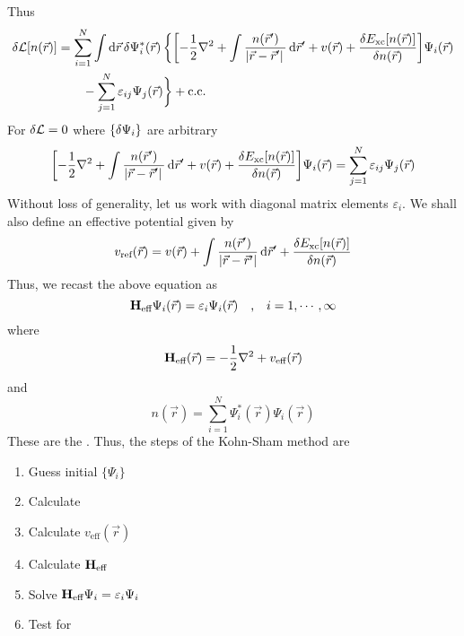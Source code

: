 \documentclass[12pt,a4paper,titlepage]{article}
\newcommand{\trm}[1]{\textrm{#1}} %
\newcommand{\ul}[1]{\underline{\smash{#1}}} %
\begin{document}
Thus
\begin{equation}
\begin{aligned}
\var{\mathcal{L}[n(\vec{r})]}&=\sum_{i=1}^{N}\int\dd{\vec{r}}\var{\Psi_{i}^{*}(\vec{r})}\bigg\{\qty[-\frac{1}{2}\nabla^{2}+\int\frac{n(\vec{r}^{\prime})}{\abs*{\vec{r}-\vec{r}^{\prime}}}\dd{\vec{r}^{\prime}}+v(\vec{r})+\fdv{E_{\trm{xc}}[n(\vec{r})]}{n(\vec{r})}]\Psi_{i}(\vec{r})\\
&\quad\quad-\sum_{j=1}^{N}\varepsilon_{ij}\Psi_{j}(\vec{r})\bigg\}+\qcc*
\end{aligned}	
\end{equation}
For $\var{\mathcal{L}}=0$ where $\{\var{\Psi_{i}}\}$ are arbitrary
\begin{equation}
\qty[-\frac{1}{2}\nabla^{2}+\int\frac{n(\vec{r}^{\prime})}{\abs*{\vec{r}-\vec{r}^{\prime}}}\dd{\vec{r}^{\prime}}+v(\vec{r})+\fdv{E_{\trm{xc}}[n(\vec{r})]}{n(\vec{r})}]\Psi_{i}(\vec{r})=\sum_{j=1}^{N}\varepsilon_{ij}\Psi_{j}(\vec{r})
\end{equation}
Without loss of generality, let us work with diagonal matrix elements $\varepsilon_{i}$. We shall also define an effective potential given by
\begin{equation}
v_{\trm{ref}}(\vec{r})=v(\vec{r})+\int\frac{n(\vec{r}^{\prime})}{\abs{\vec{r}-\vec{r}^{\prime}}}\dd{\vec{r}^{\prime}}+\fdv{E_{\trm{xc}}[n(\vec{r})]}{n(\vec{r})}
\end{equation}
Thus, we recast the above equation as
\begin{equation}
\vb{H}_{\trm{eff}}\Psi_{i}(\vec{r})=\varepsilon_{i}\Psi_{i}(\vec{r})\qq{,}i=1,\cdots,\infty
\end{equation}
where
\begin{equation}
\vb{H}_{\trm{eff}}(\vec{r})=-\frac{1}{2}\nabla^{2}+v_{\trm{eff}}(\vec{r})
\end{equation}
and
\begin{equation}
n(\vec{r})=\sum_{i=1}^{N}\Psi_{i}^{*}(\vec{r})\Psi_{i}(\vec{r})
\end{equation}
These are the \ul{Kohn-Sham equations}. Thus, the steps of the Kohn-Sham method are
\begin{enumerate}
\item Guess initial $\{\Psi_{i}\}$
\item Calculate 
\item Calculate $v_{\trm{eff}}(\vec{r})$
\item Calculate $\vb{H}_{\trm{eff}}$
\item Solve $\vb{H}_{\trm{eff}}\Psi_{i}=\varepsilon_{i}\Psi_{i}$
\item Test for 
\end{enumerate}
\end{document}
